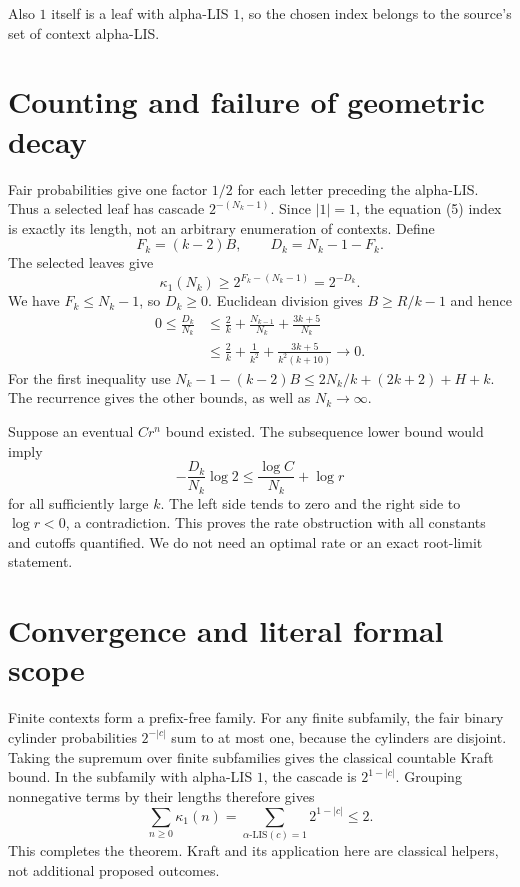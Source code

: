 \documentclass[11pt]{article}
\newcommand{\kap}{\kappa}
\begin{document}
Also $1$ itself is a leaf with alpha-LIS $1$, so the chosen index belongs
to the source's set of context alpha-LIS.

\section{Counting and failure of geometric decay}
Fair probabilities give one factor $1/2$ for each letter preceding the
alpha-LIS. Thus a selected leaf has cascade $2^{-(N_k-1)}$. Since
$|1|=1$, the equation (5) index is exactly its length, not an arbitrary
enumeration of contexts. Define
\[
 F_k=(k-2)B,\qquad D_k=N_k-1-F_k.
\]
The selected leaves give
\[
 \kap_1(N_k)\geq2^{F_k-(N_k-1)}=2^{-D_k}.
\]
We have $F_k\leq N_k-1$, so $D_k\geq0$. Euclidean division gives
$B\geq R/k-1$ and hence
\begin{align*}
 0\leq\frac{D_k}{N_k}
 &\leq \frac2k+\frac{N_{k-1}}{N_k}+\frac{3k+5}{N_k}\\
 &\leq\frac2k+\frac1{k^2}+\frac{3k+5}{k^2(k+10)}\longrightarrow0.
\end{align*}
For the first inequality use
$N_k-1-(k-2)B\leq2N_k/k+(2k+2)+H+k$.
The recurrence gives the other bounds, as well as $N_k\to\infty$.

Suppose an eventual $Cr^n$ bound existed. The subsequence lower bound
would imply
\[
 -\frac{D_k}{N_k}\log2\leq\frac{\log C}{N_k}+\log r
\]
for all sufficiently large $k$. The left side tends to zero and the right
side to $\log r<0$, a contradiction. This proves the rate obstruction
with all constants and cutoffs quantified. We do not need an optimal rate
or an exact root-limit statement.
\newpage
\section{Convergence and literal formal scope}
Finite contexts form a prefix-free family. For any finite subfamily,
the fair binary cylinder probabilities $2^{-|c|}$ sum to at most one,
because the cylinders are disjoint. Taking the supremum over finite
subfamilies gives the classical countable Kraft bound. In the subfamily
with alpha-LIS $1$, the cascade is $2^{1-|c|}$. Grouping nonnegative terms
by their lengths therefore gives
\[
 \sum_{n\geq0}\kap_1(n)
 =\sum_{\alpha\text{-LIS}(c)=1}2^{1-|c|}\leq2.
\]
This completes the theorem. Kraft and its application here are classical
helpers, not additional proposed outcomes.
\end{document}
